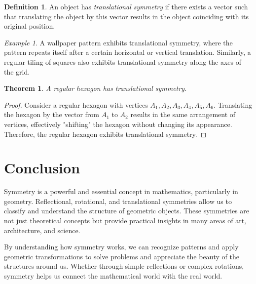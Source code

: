 \documentclass{article}
\theoremstyle{plain}
\newtheorem{theorem}{Theorem}
\theoremstyle{definition}
\newtheorem{definition}{Definition}
\theoremstyle{remark}
\newtheorem{example}{Example}
\begin{document}
\begin{definition}\label{def:translational}
An object has \textit{translational symmetry} if there exists a vector such that translating the object by this vector results in the object coinciding with its original position.
\end{definition}

\begin{example}
A wallpaper pattern exhibits translational symmetry, where the pattern repeats itself after a certain horizontal or vertical translation. Similarly, a regular tiling of squares also exhibits translational symmetry along the axes of the grid.
\end{example}

\begin{theorem}\label{thm:hexagon}
A regular hexagon has translational symmetry.
\end{theorem}

\begin{proof}
Consider a regular hexagon with vertices \(A_1, A_2, A_3, A_4, A_5, A_6\). Translating the hexagon by the vector from \(A_1\) to \(A_2\) results in the same arrangement of vertices, effectively "shifting" the hexagon without changing its appearance. Therefore, the regular hexagon exhibits translational symmetry.
\end{proof}

\section{Conclusion}
Symmetry is a powerful and essential concept in mathematics, particularly in geometry. Reflectional, rotational, and translational symmetries allow us to classify and understand the structure of geometric objects. These symmetries are not just theoretical concepts but provide practical insights in many areas of art, architecture, and science.

By understanding how symmetry works, we can recognize patterns and apply geometric transformations to solve problems and appreciate the beauty of the structures around us. Whether through simple reflections or complex rotations, symmetry helps us connect the mathematical world with the real world.

\printbibliography
\end{document}
